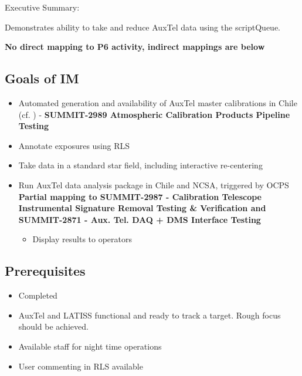 
Executive Summary:

Demonstrates ability to take and reduce AuxTel data using the scriptQueue.

\textbf{No direct mapping to P6 activity, indirect mappings are below}

\subsection{Goals of IM}
\begin{itemize}
\item Automated generation and availability of AuxTel master calibrations in Chile (cf. ) - \textbf{SUMMIT-2989 Atmospheric Calibration Products Pipeline Testing}
\item Annotate exposures using \gls{RLS}
\item Take data in a standard star field, including interactive re-centering \textbf{}
\item Run AuxTel data analysis package in Chile and NCSA, triggered by \gls{OCPS} \textbf{Partial mapping to SUMMIT-2987 - Calibration Telescope Instrumental Signature Removal Testing \& Verification and SUMMIT-2871 - Aux. Tel. DAQ + DMS Interface Testing}
\begin{itemize}
\item Display results to operators %
\end{itemize}
\end{itemize}

\subsection{Prerequisites}
\begin{itemize}
	\item{ Completed}
	\item{AuxTel and LATISS functional and ready to track a target. Rough focus should be achieved.}
	\item{Available staff for night time operations}
	\item{User commenting in \gls{RLS} available}
\end{itemize}

